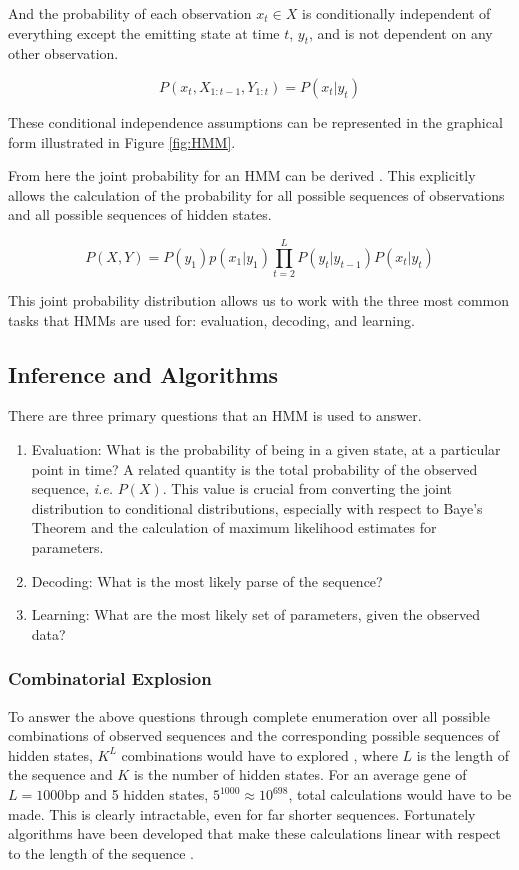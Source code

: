 And the probability of each observation $x_t \in X$ is conditionally independent of everything except the emitting state at time $t$, $y_t$, and is not dependent on any other observation.

\begin{equation}
    P(x_t,X_{1:t-1},Y_{1:t}) = P(x_t|y_t)
\end{equation}

These conditional independence assumptions can be represented in the graphical form illustrated in Figure \ref{fig:HMM}. 

From here the joint probability for an HMM can be derived \cite{Rabiner1989ARecognition}. This explicitly allows the calculation of the probability for all possible sequences of observations and all possible sequences of hidden states. 

\begin{equation}
    P(X,Y) = P(y_1)p(x_1|y_1)\prod_{t=2}^L{P(y_t|y_{t-1})P(x_t|y_t)}
\label{eq:jointhmm}
\end{equation}

This joint probability distribution allows us to work with the three most common tasks that HMMs are used for: evaluation, decoding, and learning.
\subsection{Inference and Algorithms}
There are three primary questions that an HMM is used to answer. 

\begin{enumerate}
    \item Evaluation: What is the probability of being in a given state, at a particular point in time? A related quantity is the total probability of the observed sequence, \emph{i.e.} $P(X)$. This value is crucial from converting the joint distribution to conditional distributions, especially with respect to Baye's Theorem and the calculation of maximum likelihood estimates for parameters.
    \item Decoding: What is the most likely parse of the sequence? 
    \item Learning: What are the most likely set of parameters, given the observed data?
\end{enumerate}

\subsubsection{Combinatorial Explosion}
To answer the above questions through complete enumeration over all possible combinations of observed sequences and the corresponding possible sequences of hidden states, $K^L$ combinations would have to explored \cite{Rabiner1989ARecognition}, where $L$ is the length of the sequence and $K$ is the number of hidden states. For an average gene of $L=1000$bp and 5 hidden states, $5^{1000}\approx10^{698}$, total calculations would have to be made. This is clearly intractable, even for far shorter sequences. Fortunately algorithms have been developed that make these calculations linear with respect to the length of the sequence \cite{Rabiner1989ARecognition}. 

